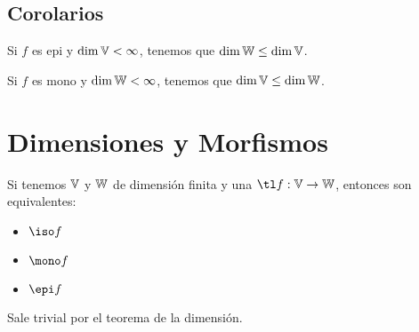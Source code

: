 \documentclass{article}
\begin{document}
\subsection{Corolarios}
Si $f$ es epi y $\dim \mathbb{V} < \infty$, tenemos que $\dim \mathbb{W} \leq \dim \mathbb{V}$.

Si $f$ es mono y $\dim \mathbb{W} < \infty$, tenemos que $\dim \mathbb{V} \leq \dim \mathbb{W}$.

\section{Dimensiones y Morfismos}
Si tenemos $\mathbb{V}$ y $\mathbb{W}$ de dimensión finita y una $\tl f : \V \to \W$,
entonces son equivalentes:
\begin{itemize}
	\item $\iso f$
	\item $\mono f$
	\item $\epi f$
\end{itemize}
Sale trivial por el teorema de la dimensión.
\end{document}
